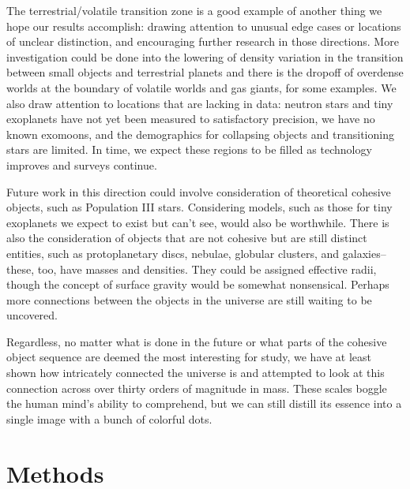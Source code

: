 \documentclass[twocolumn,linenumbers]{aastex631}
\begin{document}
The terrestrial/volatile transition zone is a good example of another thing we hope our results accomplish: drawing attention to unusual edge cases or locations of unclear distinction, and encouraging further research in those directions. More investigation could be done into the lowering of density variation in the transition between small objects and terrestrial planets and there is the dropoff of overdense worlds at the boundary of volatile worlds and gas giants, for some examples. We also draw attention to locations that are lacking in data: neutron stars and tiny exoplanets have not yet been measured to satisfactory precision, we have no known exomoons, and the demographics for collapsing objects and transitioning stars are limited. In time, we expect these regions to be filled as technology improves and surveys continue. 

Future work in this direction could involve consideration of theoretical cohesive objects, such as Population III stars. Considering models, such as those for tiny exoplanets we expect to exist but can't see, would also be worthwhile. There is also the consideration of objects that are not cohesive but are still distinct entities, such as protoplanetary discs, nebulae, globular clusters, and galaxies--these, too, have masses and densities. They could be assigned effective radii, though the concept of surface gravity would be somewhat nonsensical. Perhaps more connections between the objects in the universe are still waiting to be uncovered. 

Regardless, no matter what is done in the future or what parts of the cohesive object sequence are deemed the most interesting for study, we have at least shown how intricately connected the universe is and attempted to look at this connection across over thirty orders of magnitude in mass. These scales boggle the human mind's ability to comprehend, but we can still distill its essence into a single image with a bunch of colorful dots.

\section{Methods} \label{sec:methods}
\end{document}
